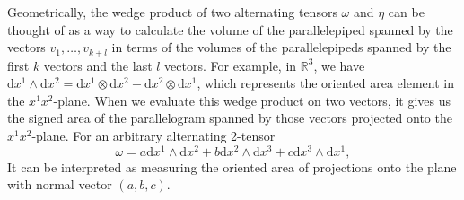 \documentclass[../main.tex]{subfiles}
\begin{document}
\begin{remark}
  Geometrically, the wedge product of two alternating tensors $\omega$ and $\eta$ can be thought of as a way to calculate the volume of the parallelepiped spanned by the vectors $v_1, \dots, v_{k+l}$ in terms of the volumes of the parallelepipeds spanned by the first $k$ vectors and the last $l$ vectors. For example, in $\mathbb{R}^3$, we have $\mathrm{d} x^1 \wedge \mathrm{d} x^2 = \mathrm{d} x^1 \otimes \mathrm{d} x^2 - \mathrm{d} x^2 \otimes \mathrm{d} x^1$, which represents the oriented area element in the $x^1x^2$-plane. When we evaluate this wedge product on two vectors, it gives us the signed area of the parallelogram spanned by those vectors projected onto the $x^1x^2$-plane. For an arbitrary alternating 2-tensor
  \begin{equation*}
    \omega = a \mathrm{d} x^1 \wedge \mathrm{d} x^2 + b \mathrm{d} x^2 \wedge \mathrm{d} x^3 + c \mathrm{d} x^3 \wedge \mathrm{d} x^1,
  \end{equation*}
  It can be interpreted as measuring the oriented area of projections onto the plane with normal vector $(a,b,c)$.
\end{remark}
\end{document}
